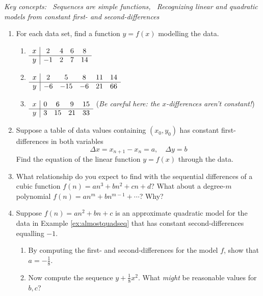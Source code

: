 \begin{exercises}{}{}
	\hangindent\leftmargini
	\emph{Key concepts: \ Sequences are simple functions, \ Recognizing linear and quadratic models from constant first- and second-differences}
	
	\begin{enumerate}
		\item For each data set, find a function $y=f(x)$ modelling the data.
		\begin{enumerate}
		  \item $\begin{array}[t]{c|ccccc}
				x&2&4&6&8\\\hline
				y&-1&2&7&14
			\end{array}$
			\item $\begin{array}[t]{c|ccccc}
				x&2&5&8&11&14\\\hline
				y&-6&-15&-6&21&66
			\end{array}$
			\item $\begin{array}[t]{c|ccccc}
				x&0&6&9&15\\\hline
				y&3&15&21&33
			\end{array}$\qquad
		(\emph{Be careful here: the $x$-differences aren't constant!})
		\end{enumerate}
		

	  \item Suppose a table of data values containing $(x_0,y_0)$ has constant first-differences in both variables
	  \[
	  	\Delta x=x_{n+1}-x_n=a,\quad  \Delta y=b
	  \]
	  Find the equation of the linear function $y=f(x)$ through the data.
	  
	  
	
	
	  \item What relationship do you expect to find with the sequential differences of a cubic function $f(n)=an^3+bn^2+cn+d$? What about a degree-$m$ polynomial $f(n)=an^m+bn^{m-1}+\cdots$? Why?
	  
	  
	  \item\label{exs:altquadmodel} Suppose $f(n)=an^2+bn+c$ is an approximate quadratic model for the data in Example \ref{ex:almostquadseq} that has constant second-differences equalling $-1$.
	  \begin{enumerate}
	    \item By computing the first- and second-differences for the model $f$, show that $a=-\frac 18$.
	    \item Now compute the sequence $y+\frac 18x^2$. What \emph{might} be reasonable values for $b,c$?
	  \end{enumerate}
	  

\end{enumerate}
\end{exercises}
